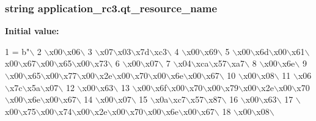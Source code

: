 \subsubsection[{qt\+\_\+resource\+\_\+name}]{\setlength{\rightskip}{0pt plus 5cm}string application\+\_\+rc3.\+qt\+\_\+resource\+\_\+name}\label{namespaceapplication__rc3_a6b87b95c69f512af275e9f9b5e4aa4a3}
{\bfseries Initial value\+:}
\begin{DoxyCode}
1 = b\textcolor{stringliteral}{"\(\backslash\)}
2 \textcolor{stringliteral}{\(\backslash\)x00\(\backslash\)x06\(\backslash\)}
3 \textcolor{stringliteral}{\(\backslash\)x07\(\backslash\)x03\(\backslash\)x7d\(\backslash\)xc3\(\backslash\)}
4 \textcolor{stringliteral}{\(\backslash\)x00\(\backslash\)x69\(\backslash\)}
5 \textcolor{stringliteral}{\(\backslash\)x00\(\backslash\)x6d\(\backslash\)x00\(\backslash\)x61\(\backslash\)x00\(\backslash\)x67\(\backslash\)x00\(\backslash\)x65\(\backslash\)x00\(\backslash\)x73\(\backslash\)}
6 \textcolor{stringliteral}{\(\backslash\)x00\(\backslash\)x07\(\backslash\)}
7 \textcolor{stringliteral}{\(\backslash\)x04\(\backslash\)xca\(\backslash\)x57\(\backslash\)xa7\(\backslash\)}
8 \textcolor{stringliteral}{\(\backslash\)x00\(\backslash\)x6e\(\backslash\)}
9 \textcolor{stringliteral}{\(\backslash\)x00\(\backslash\)x65\(\backslash\)x00\(\backslash\)x77\(\backslash\)x00\(\backslash\)x2e\(\backslash\)x00\(\backslash\)x70\(\backslash\)x00\(\backslash\)x6e\(\backslash\)x00\(\backslash\)x67\(\backslash\)}
10 \textcolor{stringliteral}{\(\backslash\)x00\(\backslash\)x08\(\backslash\)}
11 \textcolor{stringliteral}{\(\backslash\)x06\(\backslash\)x7c\(\backslash\)x5a\(\backslash\)x07\(\backslash\)}
12 \textcolor{stringliteral}{\(\backslash\)x00\(\backslash\)x63\(\backslash\)}
13 \textcolor{stringliteral}{\(\backslash\)x00\(\backslash\)x6f\(\backslash\)x00\(\backslash\)x70\(\backslash\)x00\(\backslash\)x79\(\backslash\)x00\(\backslash\)x2e\(\backslash\)x00\(\backslash\)x70\(\backslash\)x00\(\backslash\)x6e\(\backslash\)x00\(\backslash\)x67\(\backslash\)}
14 \textcolor{stringliteral}{\(\backslash\)x00\(\backslash\)x07\(\backslash\)}
15 \textcolor{stringliteral}{\(\backslash\)x0a\(\backslash\)xc7\(\backslash\)x57\(\backslash\)x87\(\backslash\)}
16 \textcolor{stringliteral}{\(\backslash\)x00\(\backslash\)x63\(\backslash\)}
17 \textcolor{stringliteral}{\(\backslash\)x00\(\backslash\)x75\(\backslash\)x00\(\backslash\)x74\(\backslash\)x00\(\backslash\)x2e\(\backslash\)x00\(\backslash\)x70\(\backslash\)x00\(\backslash\)x6e\(\backslash\)x00\(\backslash\)x67\(\backslash\)}
18 \textcolor{stringliteral}{\(\backslash\)x00\(\backslash\)x08\(\backslash\)}

\end{DoxyCode}
